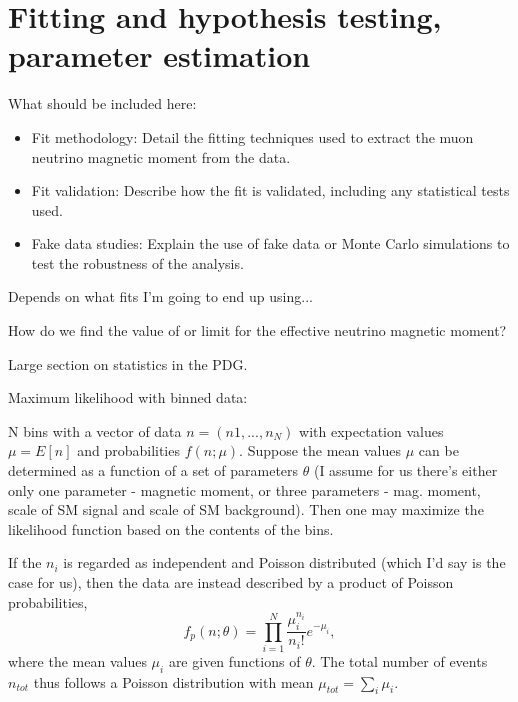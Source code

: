 \section{Fitting and hypothesis testing, parameter estimation}\label{sec:NuMMFitting}

What should be included here:
\begin{itemize}
\item Fit methodology: Detail the fitting techniques used to extract the muon neutrino magnetic moment from the data.
\item Fit validation: Describe how the fit is validated, including any statistical tests used.
\item Fake data studies: Explain the use of fake data or Monte Carlo simulations to test the robustness of the analysis.
\end{itemize}

Depends on what fits I'm going to end up using...

\iffalse
How do we find the value of or limit for the effective neutrino magnetic moment?

Large section on statistics in the PDG.

Maximum likelihood with binned data:

N bins with a vector of data $n=\left(n1,...,n_N \right)$ with expectation values $\mu=E\left[n\right]$ and probabilities $f\left(n;\mu\right)$. Suppose the mean values $\mu$ can be determined as a function of a set of parameters $\theta$ (I assume for us there's either only one parameter - magnetic moment, or three parameters - mag. moment, scale of SM signal and scale of SM background). Then one may maximize the likelihood function based on the contents of the bins.

If the $n_i$ is regarded as independent and Poisson distributed (which I'd say is the case for us), then the data are instead described by a product of Poisson probabilities,
\begin{equation}
f_p\left(n;\theta\right)=\prod_{i=1}^{N} \frac{\mu_i^{n_i}}{n_i!}e^{-\mu_i},
\end{equation}
where the mean values $\mu_i$ are given functions of $\theta$. The total number of events $n_{tot}$ thus follows a Poisson distribution with mean $\mu_{tot}=\sum_i \mu_i$.

